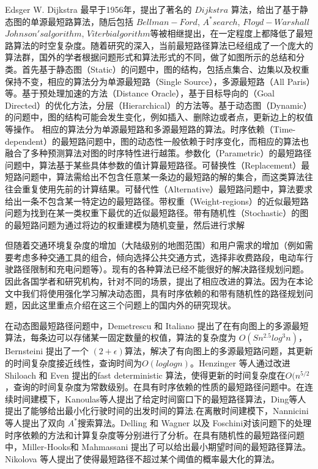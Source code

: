 \documentclass{standalone}
\begin{document}
Edsger W. Dijkstra 最早于1956年，提出了著名的 $Dijkstra$ 算法，给出了基于静态图的单源最短路算法，随后包括 $Bellman-Ford$, $A^* search$, $Floyd-Warshall$ $Johnson's algorithm$, $Viterbi algorithm$等被相继提出，在一定程度上都降低了最短路算法的时空复杂度。随着研究的深入，当前最短路径算法已经组成了一个庞大的算法群，国外的学者根据问题形式和算法形式的不同，做了如图所示的总结和分类。首先基于静态图（Static）的问题中，图的结构，包括点集合、边集以及权重保持不变，相应的算法分为单源最短路（Single Source），多源最短路（All Paris）等。基于预处理加速的方法（Distance Oracle），基于目标导向的（Goal Directed）的优化方法，分层（Hierarchical）的方法等。基于动态图（Dynamic）的问题中，图的结构可能会发生变化，例如插入、删除边或者点，更新边上的权值等操作。 相应的算法分为单源最短路和多源最短路的算法。时序依赖（Time-dependent）的最短路问题中，图的动态性一般依赖于时序变化，而相应的算法也融合了多种预测算法对图的时序特性进行越策。参数化（Parametric）的最短路径问题中，算法基于某些具体参数的值计算最短路径。可替换性（Replacement）最短路问题中，算法需给出不包含任意某一条边的最短路的解的集合，而这类算法往往会重复使用先前的计算结果。可替代性（Alternative）最短路问题中，算法要求给出一条不包含某一特定边的最短路径。带权重（Weight-regions）的近似最短路问题为找到在某一类权重下最优的近似最短路径。带有随机性（Stochastic）的图的最短路问题为通过将边的权重建模为随机变量，然后进行求解\par

但随着交通环境复杂度的增加（大陆级别的地图范围）和用户需求的增加（例如需要考虑多种交通工具的组合，倾向选择公共交通方式，选择非收费路段，电动车行驶路径限制和充电问题等）。现有的各种算法已经不能很好的解决路径规划问题。因此各国学者和研究机构，针对不同的场景，提出了相应改进的算法。因为在本论文中我们将使用强化学习解决动态图，具有时序依赖的和带有随机性的路径规划问题，因此这里重点介绍在这三个问题上的国内外的研究现状。\par

在动态图最短路径问题中，Demetrescu 和 Italiano 提出了在有向图上的多源最短算法，每条边可以存储某一固定数量的权值，算法的复杂度为 $O(Sn^{2.5}log^3n)$，Bernsteini 提出了一个 $(2+\epsilon)$算法，解决了有向图上的多源最短路问题，其更新的时间复杂度接近线性，查询时间为$O(loglogn)$。Henzinger 等人通过改进 Shiloach 和 Even 提出的fast deterministic 算法，使得更新的时间复杂度在$O(n^{5/2}$，查询的时间复杂度为常数级别。在具有时序依赖的性质的最短路径问题中。在连续时间建模下，Kanoulas等人提出了给定时间窗口下的最短路径算法，Ding等人提出了能够给出最小化行驶时间的出发时间的算法.在离散时间建模下，Nannicini等人提出了双向 $A^*$搜索算法。Delling 和 Wagner 以及 Foschini对该问题下的处理时序依赖的方法和计算复杂度等分别进行了分析。在具有随机性的最短路径问题中，Miller-Hooks和 Mahmassani 提出了可以给出最小期望时间的最短路径算法。Nikolova 等人提出了使得最短路径不超过某个阈值的概率最大化的算法。
\end{document}
